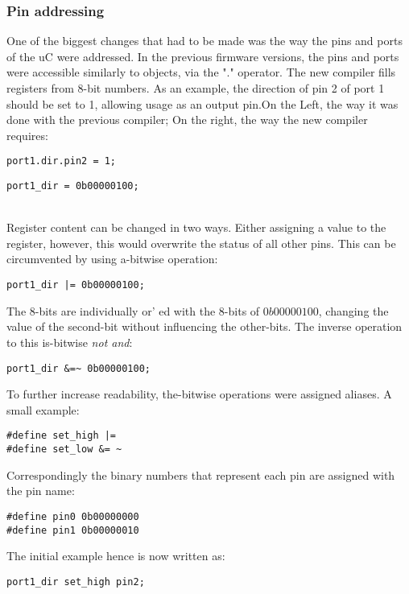 \subsubsection*{Pin addressing}
One of the biggest changes that had to be made was the way the pins and ports of the \ac{uC} were addressed. In the previous firmware versions, the pins and ports were accessible similarly to objects, via the "." operator. The new compiler fills registers from 8-bit numbers. As an example, the direction of pin 2 of port 1 should be set to 1, allowing usage as an output pin.On the Left, the way it was done with the previous compiler; On the right, the way the new compiler requires:\\
\begin{minipage}{\textwidth}
\begin{minipage}{0.49\textwidth}
\begin{lstlisting}[style=cpp]
port1.dir.pin2 = 1;
\end{lstlisting}
\end{minipage} 
\begin{minipage}{0.49\textwidth}
\begin{lstlisting}[style=cpp]
port1_dir = 0b00000100;
\end{lstlisting}
\end{minipage}
\end{minipage}\\
\newline
Register content can be changed in two ways. Either assigning a value to the register, however, this would overwrite the status of all other pins. This can be circumvented by using a-bitwise operation:
\begin{lstlisting}[style=cpp]
port1_dir |= 0b00000100;
\end{lstlisting}
The 8-bits are individually or' ed with the 8-bits of $0b00000100$, changing the value of the second-bit without influencing the other-bits.
The inverse operation to this is-bitwise \textit{not and}:
\begin{lstlisting}[style=cpp]
port1_dir &=~ 0b00000100;
\end{lstlisting}
To further increase readability, the-bitwise operations were assigned aliases. A small example:
\begin{lstlisting}[style=cpp]
#define set_high |= 
#define set_low &= ~
\end{lstlisting}
Correspondingly the binary numbers that represent each pin are assigned with the pin name:
\begin{lstlisting}[style=cpp]
#define pin0 0b00000000
#define pin1 0b00000010
\end{lstlisting}
The initial example hence is now written as:
\begin{lstlisting}[style=cpp]
port1_dir set_high pin2;
\end{lstlisting}

